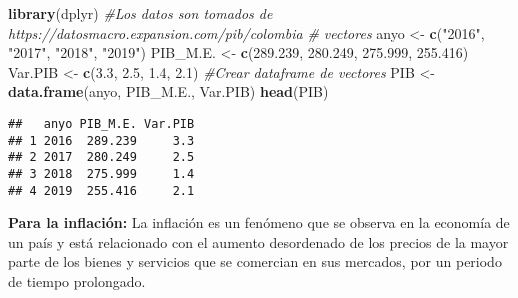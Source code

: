\documentclass[
  11pt,
]{article}
\newenvironment{Shaded}{\begin{snugshade}}{\end{snugshade}}
\newcommand{\CommentTok}[1]{\textcolor[rgb]{0.56,0.35,0.01}{\textit{#1}}}
\newcommand{\FloatTok}[1]{\textcolor[rgb]{0.00,0.00,0.81}{#1}}
\newcommand{\KeywordTok}[1]{\textcolor[rgb]{0.13,0.29,0.53}{\textbf{#1}}}
\newcommand{\NormalTok}[1]{#1}
\newcommand{\StringTok}[1]{\textcolor[rgb]{0.31,0.60,0.02}{#1}}
\begin{document}
\begin{Shaded}
\begin{Highlighting}[]
\KeywordTok{library}\NormalTok{(dplyr)}
\CommentTok{#Los datos son tomados de https://datosmacro.expansion.com/pib/colombia}
\CommentTok{# vectores }
\NormalTok{anyo <-}\StringTok{ }\KeywordTok{c}\NormalTok{(}\StringTok{"2016"}\NormalTok{, }\StringTok{"2017"}\NormalTok{, }\StringTok{"2018"}\NormalTok{, }\StringTok{"2019"}\NormalTok{)}
\NormalTok{PIB_M.E. <-}\StringTok{ }\KeywordTok{c}\NormalTok{(}\FloatTok{289.239}\NormalTok{, }\FloatTok{280.249}\NormalTok{, }\FloatTok{275.999}\NormalTok{, }\FloatTok{255.416}\NormalTok{)}
\NormalTok{Var.PIB <-}\StringTok{ }\KeywordTok{c}\NormalTok{(}\FloatTok{3.3}\NormalTok{, }\FloatTok{2.5}\NormalTok{, }\FloatTok{1.4}\NormalTok{, }\FloatTok{2.1}\NormalTok{)}
\CommentTok{#Crear dataframe de vectores}
\NormalTok{PIB <-}\StringTok{ }\KeywordTok{data.frame}\NormalTok{(anyo, PIB_M.E., Var.PIB)}
\KeywordTok{head}\NormalTok{(PIB)}
\end{Highlighting}
\end{Shaded}

\begin{verbatim}
##   anyo PIB_M.E. Var.PIB
## 1 2016  289.239     3.3
## 2 2017  280.249     2.5
## 3 2018  275.999     1.4
## 4 2019  255.416     2.1
\end{verbatim}

\textbf{Para la inflación:} La inflación es un fenómeno que se observa
en la economía de un país y está relacionado con el aumento desordenado
de los precios de la mayor parte de los bienes y servicios que se
comercian en sus mercados, por un periodo de tiempo prolongado.

\begin{Shaded}
\end{Shaded}
\end{document}
